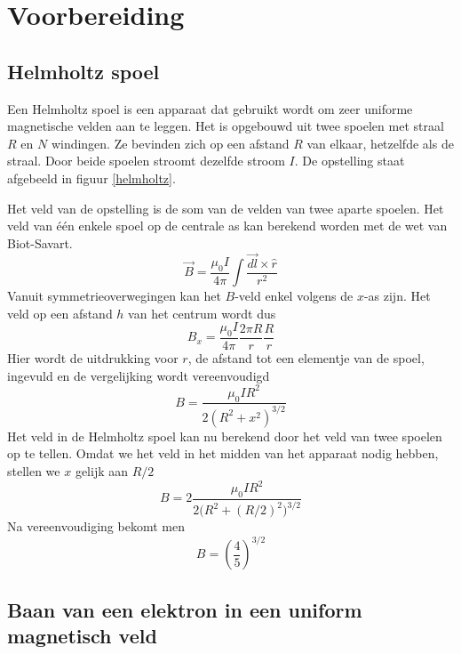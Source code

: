 \section{Voorbereiding}

\subsection{Helmholtz spoel}

Een Helmholtz spoel is een apparaat dat gebruikt wordt om zeer uniforme 
magnetische velden aan te leggen. Het is opgebouwd uit twee spoelen met straal 
$R$ en $N$ windingen. Ze bevinden zich op een afstand $R$ van elkaar,
hetzelfde als de straal. Door beide spoelen stroomt dezelfde stroom $I$. De 
opstelling staat afgebeeld in figuur \ref{helmholtz}.


Het veld van de opstelling is de som van de velden van twee aparte spoelen. Het 
veld van \'e\'en enkele spoel op de centrale as kan berekend worden met de wet 
van Biot-Savart.
$$
\vec{B} = \frac{\mu_0 I}{4 \pi} \int \frac{\vec{dl} \times \hat{r}}{r^2}
$$
Vanuit symmetrieoverwegingen kan het $B$-veld enkel volgens de $x$-as zijn. Het 
veld op een afstand $h$ van het centrum wordt dus
$$
B_x = \frac{\mu_0 I}{4 \pi} \frac{2 \pi R}{r} \frac{R}{r}
$$
Hier wordt de uitdrukking voor $r$, de afstand tot een elementje van de spoel, 
ingevuld en de vergelijking wordt vereenvoudigd
$$
B = \frac{\mu_0 I R^2}{2(R^2+x^2)^{3/2}}
$$
Het veld in de Helmholtz spoel kan nu berekend door het veld van twee spoelen 
op te tellen. Omdat we het veld in het midden van het apparaat nodig hebben, 
stellen we $x$ gelijk aan $R/2$
$$
B = 2 \frac{\mu_0 I R^2}{{2(R^2+(R/2)^2})^{3/2}}
$$
Na vereenvoudiging bekomt men
$$
B = \left(\frac{4}{5}\right)^{3/2} 
$$

\subsection{Baan van een elektron in een uniform magnetisch veld}

